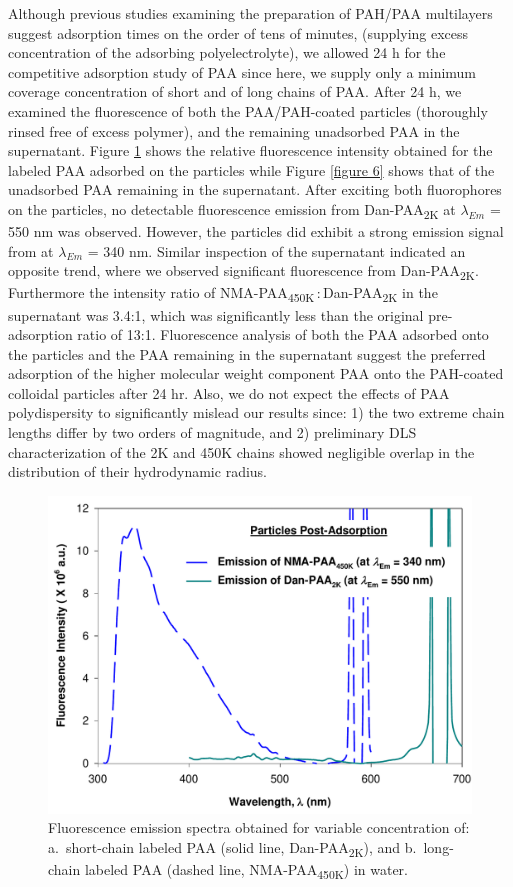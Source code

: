 \documentclass[journal=mamobx,manuscript=article]{achemso}
\begin{document}
Although previous studies examining the preparation of PAH/PAA multilayers suggest adsorption times on the order of tens of minutes, (supplying excess concentration of the adsorbing polyelectrolyte), we allowed 24 h for the competitive adsorption study of PAA since here, we supply only a minimum coverage concentration of short and of long chains of PAA.  After 24 h, we examined the fluorescence of both the PAA/PAH-coated particles (thoroughly rinsed free of excess polymer), and the remaining unadsorbed PAA in the supernatant.  Figure \ref{figure 5} shows the relative fluorescence intensity obtained for the labeled PAA adsorbed on the particles while Figure \ref{figure 6} shows that of the unadsorbed PAA remaining in the supernatant.  After exciting both fluorophores on the particles, no detectable fluorescence emission from Dan-PAA\textsubscript{2K} at $\lambda_{Em}$ = 550 nm was observed.  However, the particles did exhibit a strong emission signal from at $\lambda_{Em}$ = 340 nm.  Similar inspection of the supernatant indicated an opposite trend, where we observed significant fluorescence from Dan-PAA\textsubscript{2K}.  Furthermore the intensity ratio of NMA-PAA\textsubscript{450K}\,:\,Dan-PAA\textsubscript{2K} in the supernatant was 3.4:1, which was significantly less than the original pre-adsorption ratio of 13:1.  Fluorescence analysis of both the PAA adsorbed 
onto the particles and the PAA remaining in the supernatant suggest the preferred adsorption of the higher molecular weight component PAA onto the PAH-coated colloidal particles after 24 hr.  Also, we do not expect the effects of PAA polydispersity to significantly mislead our results since: 1) the two extreme chain lengths differ by two orders of magnitude, and 2) preliminary DLS characterization of the 2K and 450K chains showed negligible overlap in the distribution of their hydrodynamic radius.

\begin{figure}[H]
\includegraphics[scale=0.45]{Figure5_.pdf}
\caption{Fluorescence emission spectra obtained for variable concentration of: a.\ short-chain labeled PAA (solid line, Dan-PAA\textsubscript{2K}), and b.\ long-chain labeled PAA (dashed line, NMA-PAA\textsubscript{450K}) in water.}
\label{figure 5}
\end{figure}
\end{document}
